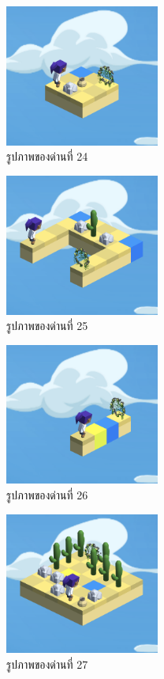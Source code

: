 \begin{figure}[H]
    \begin{center}
    \includegraphics[width=2in]{pic-toro/stage/s24.png}
    \end{center}
    \caption[รูปภาพของด่านที่ 24]{รูปภาพของด่านที่ 24}
    \label{s24}
\end{figure}
\begin{figure}[H]
    \begin{center}
    \includegraphics[width=2in]{pic-toro/stage/s25.png}
    \end{center}
    \caption[รูปภาพของด่านที่ 25]{รูปภาพของด่านที่ 25}
    \label{s25}
\end{figure}
\begin{figure}[H]
    \begin{center}
    \includegraphics[width=2in]{pic-toro/stage/s26.png}
    \end{center}
    \caption[รูปภาพของด่านที่ 26]{รูปภาพของด่านที่ 26}
    \label{s26}
\end{figure}
\begin{figure}[H]
    \begin{center}
    \includegraphics[width=2in]{pic-toro/stage/s27.png}
    \end{center}
    \caption[รูปภาพของด่านที่ 27]{รูปภาพของด่านที่ 27}
    \label{s27}
\end{figure}
